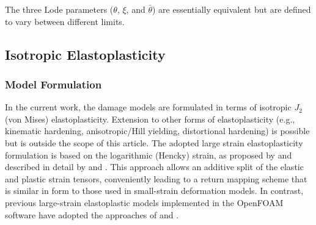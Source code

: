 \documentclass[sn-mathphys,Numbered]{sn-jnl}%
\begin{document}
The three Lode parameters ($\theta$, $\xi$, and $\bar{\theta}$) are essentially equivalent but are defined to vary between different limits.


\subsection{Isotropic Elastoplasticity}


\subsubsection{Model Formulation}

In the current work, the damage models are formulated in terms of isotropic $J_2$ (von Mises) elastoplasticity.
Extension to other forms of elastoplasticity (e.g., kinematic hardening, anisotropic/Hill yielding, distortional hardening) is possible but is outside the scope of this article.
The adopted large strain elastoplasticity formulation is based on the logarithmic (Hencky) strain, as proposed by \citet{eterovic_hyperelastic-based_1990} and described in detail by \citet{koji_inelastic_2010} and \citet{de_souza_neto_computational_2008}.
This approach allows an additive split of the elastic and plastic strain tensors, conveniently leading to a return mapping scheme that is similar in form to those used in small-strain deformation models.
In contrast, previous large-strain elastoplastic models \citep{cardiff_lagrangian_2017, clancy_improving_2019} implemented in the OpenFOAM software have adopted the approaches of \citet{caminero_modeling_2011} and \citet{simo_computational_1998}.
\end{document}
